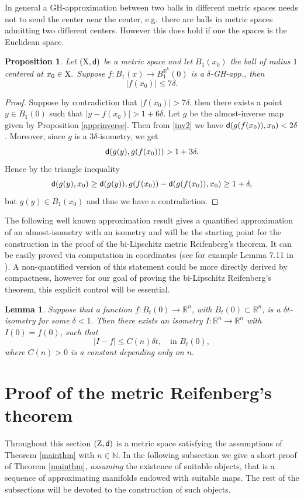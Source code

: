 \documentclass[11pt]{article}
\newcommand{\rr}{\mathbb{R}}
\newcommand{\sfd}{{\sf d}}
\newcommand{\X}{{\rm X}}
\newcommand{\Z}{{\rm Z}}
\theoremstyle{plain}
\newtheorem{lemma}[theorem]{Lemma}
\newtheorem{prop}[theorem]{Proposition}
\theoremstyle{definition}
\numberwithin{equation}{section}
\begin{document}
In general a GH-approximation between two balls in different metric spaces needs not to send the center near the center, e.g.\ there are balls in metric spaces admitting two different centers. However this does hold if one the spaces is the Euclidean space.
\begin{prop}\label{centerappr}
	Let $(\X,\sfd)$ be a metric space and let $B_1(x_0)$ the ball of radius $1$ centered at $x_0 \in \X.$ Suppose $f: B_1(x)\to B^{\rr^k}_1(0)$ is a $\delta$-GH-app., then 
	\[|f(x_0)|\le 7\delta .\]
\end{prop}
\begin{proof}
	Suppose by contradiction that $|f(x_0)|>7\delta$, then there exists a point $y \in B_1(0)$ such that $|y-f(x_0)|>1+6\delta$. Let $g$ be the almost-inverse map given by Proposition \ref{apprinverse}. Then from \eqref{inv2} we have $\sfd(g(f(x_0)),x_0)<2\delta$. Moreover, since $g$ is a $3\delta$-isometry, we get
	\[\sfd(g(y),g(f(x_0)))>1+3\delta. \]
	Hence by the triangle inequality 
	\[\sfd(g(y),x_0)\ge \sfd(g(y)),g(f(x_0))-\sfd(g(f(x_0)),x_0) \ge 1+\delta,\]
	but $g(y)\in B_1(x_0)$ and thus we have a contradiction.
\end{proof}


The following  well known approximation result gives a quantified approximation of an almost-isometry with an isometry and will  be the starting point for the construction in the proof of the bi-Lipschitz metric Reifenberg's theorem.  It can be easily proved via computation in coordinates
(see for example Lemma 7.11 in \cite{snow}).  A non-quantified version of this statement could be more directly derived by compactness, however  for our goal of proving the bi-Lipschitz Reifenberg's theorem, this explicit control will be essential. 
\begin{lemma}\label{AA}
	Suppose that a function $f: {B_{t}(0)} \to  \rr^n$, with $B_t(0)\subset \rr^n$, is a $\delta t$-isometry
	for some $\delta<1.$ Then there exists an  isometry $I: \rr^n \to \rr^n$ with $I(0)=f(0)$, such that 
	\begin{equation}\label{nn}
		|I-f|\le C(n)\delta t, \quad \text{in $B_t(0)$},
	\end{equation}
 where $C(n)>0$ is a constant depending only on $n.$
\end{lemma}


	




\section{Proof of the metric  Reifenberg's theorem}\label{sec:constructions}
Throughout this section $(\Z,\sfd)$ is a metric space satisfying the assumptions of Theorem \ref{mainthm} with $n \in \mathbb{N}$. In the following subsection we give a short proof of Theorem \ref{mainthm}, \emph{assuming} the existence of suitable objects, that is a sequence of approximating manifolds endowed with suitable maps. The rest of the subsections will be devoted to the construction of such objects.
\end{document}
